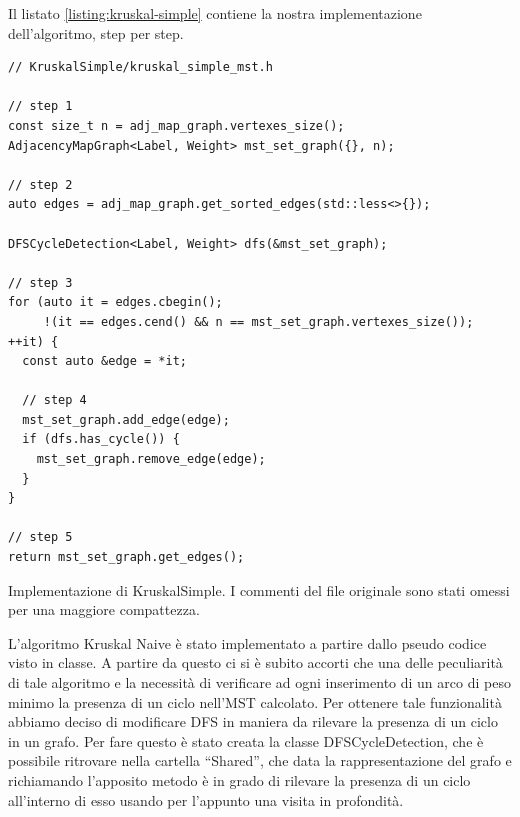 \noindent Il listato \ref{listing:kruskal-simple} contiene la nostra implementazione dell'algoritmo, step per step.

\begin{listing}[!ht]
\begin{verbatim}
// KruskalSimple/kruskal_simple_mst.h

// step 1
const size_t n = adj_map_graph.vertexes_size();
AdjacencyMapGraph<Label, Weight> mst_set_graph({}, n);

// step 2
auto edges = adj_map_graph.get_sorted_edges(std::less<>{});

DFSCycleDetection<Label, Weight> dfs(&mst_set_graph);

// step 3
for (auto it = edges.cbegin();
     !(it == edges.cend() && n == mst_set_graph.vertexes_size()); ++it) {
  const auto &edge = *it;
  
  // step 4
  mst_set_graph.add_edge(edge);
  if (dfs.has_cycle()) {
    mst_set_graph.remove_edge(edge);
  }
}

// step 5
return mst_set_graph.get_edges();
\end{verbatim}
\caption{Implementazione di KruskalSimple. I commenti del file originale sono stati omessi per una maggiore compattezza.}
\label{listing:kruskal-simple}
\end{listing}

\noindent L'algoritmo Kruskal Naive è stato implementato a partire dallo pseudo codice visto in classe. A partire da questo ci si è subito accorti che una delle peculiarità di tale algoritmo e la necessità di verificare ad ogni inserimento di un arco di peso minimo la presenza di un ciclo nell'MST calcolato. Per ottenere tale funzionalità abbiamo deciso di modificare DFS in maniera da rilevare la presenza di un ciclo in un grafo. Per fare questo è stato creata la classe DFSCycleDetection, che è possibile ritrovare nella cartella ``Shared'', che data la rappresentazione del grafo e richiamando l'apposito metodo  è in grado di rilevare la presenza di un ciclo all'interno di esso usando per l'appunto una visita in profondità.\\

